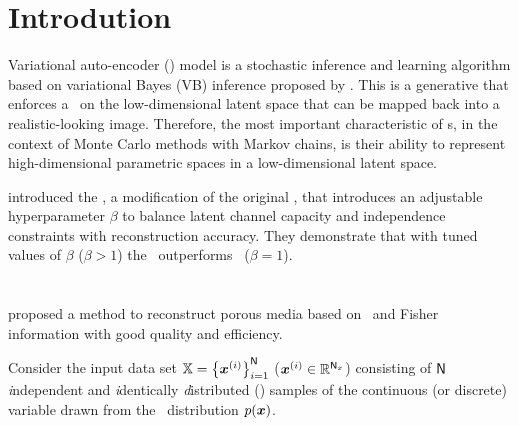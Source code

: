 \section{Introdution}

Variational auto-encoder (\VAE) model is a stochastic inference and learning algorithm based on variational Bayes (VB) inference proposed by \cite{kingma2014}.
This is a generative that enforces a \prior\ on the low-dimensional latent space that can be mapped back into a realistic-looking image.
Therefore, the most important characteristic of \VAE s, in the context of Monte Carlo methods with Markov chains, is their ability to represent high-dimensional parametric spaces in a low-dimensional latent space.

\cite{Higgins2016betaVAELB} introduced the \bVAE, a modification of the original \VAE, that introduces an adjustable hyperparameter $\beta$ to balance latent channel capacity and independence constraints with reconstruction accuracy.
They demonstrate that with tuned values of $\beta$ ($\beta>1$) the \bVAE\ outperforms \VAE\ ($\beta=1$).

\cite{Makhzani2015,louizos2017variational,burda2016importance,Zheng2019,vahdat2020}
\section{\cite{Zhang2022}}

\cite{Zhang2022} proposed a method to reconstruct porous media based on \VAE\ and Fisher information with good quality and efficiency.

Consider the input data set $\mathbb{X} = \left\{ \boldsymbol{x}^{(i)} \right\}_{i=1}^{\mathsf{N}}$ ($\boldsymbol{x}^{(i)}\in\mathbb{R}^{\mathsf{N}_{x}}$) consisting of $\mathsf{N}$ \textit{i}ndependent and \textit{i}dentically \textit{d}istributed (\iid) samples of the continuous (or discrete) variable drawn from the \prior\ distribution $p(\boldsymbol{x})$.

